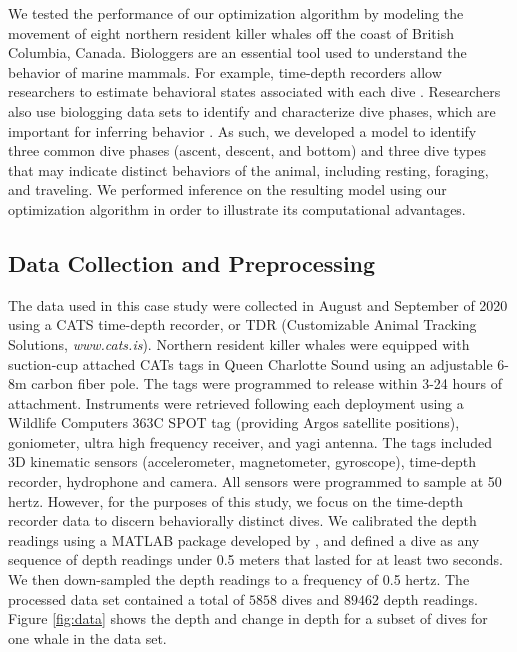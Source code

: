 
We tested the performance of our optimization algorithm by modeling the movement of eight northern resident killer whales off the coast of British Columbia, Canada.
Biologgers are an essential tool used to understand the behavior of marine mammals. For example, time-depth recorders allow researchers to estimate behavioral states associated with each dive \citep[e.g. foraging, resting, and traveling,][]{Tennessen:2023}. Researchers also use biologging data sets to identify and characterize dive phases, which are important for inferring behavior \citep[e.g., prey capture often occurs in the bottom phase of a foraging dive,][]{Wright:2017,Jensen:2023}. As such, we developed a model to identify three common dive phases (ascent, descent, and bottom) and three dive types that may indicate distinct behaviors of the animal, including resting, foraging, and traveling. We performed inference on the resulting model using our optimization algorithm in order to illustrate its computational advantages.

\subsection{Data Collection and Preprocessing}

The data used in this case study were collected in August and September of 2020 using a CATS time-depth recorder, or TDR (Customizable Animal Tracking Solutions, {\em{www.cats.is}}). Northern resident killer whales were equipped with suction-cup attached CATs tags in Queen Charlotte Sound using an adjustable 6-8m carbon fiber pole. The tags were programmed to release within 3-24 hours of attachment. Instruments were retrieved following each deployment using a Wildlife Computers 363C SPOT tag (providing Argos satellite positions), goniometer, ultra high frequency receiver, and yagi antenna. The tags included 3D kinematic sensors (accelerometer, magnetometer, gyroscope), time-depth recorder, hydrophone and camera. All sensors were programmed to sample at 50 hertz. However, for the purposes of this study, we focus on the time-depth recorder data to discern behaviorally distinct dives. We calibrated the depth readings using a MATLAB package developed by \citet{Cade:2021}, and defined a dive as any sequence of depth readings under 0.5 meters that lasted for at least two seconds. We then down-sampled the depth readings to a frequency of 0.5 hertz. The processed data set contained a total of $5858$ dives and $89462$ depth readings. Figure \ref{fig:data} shows the depth and change in depth for a subset of dives for one whale in the data set. 

